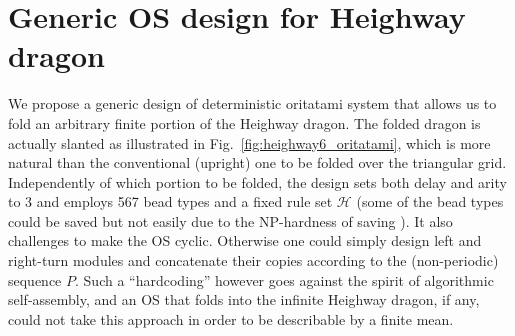 	\section{Generic OS design for Heighway dragon}



We propose a generic design of deterministic oritatami system that allows us to fold an arbitrary finite portion of the Heighway dragon. 
The folded dragon is actually slanted as illustrated in Fig.~\ref{fig:heighway6_oritatami}, which is more natural than the conventional (upright) one to be folded over the triangular grid. 
Independently of which portion to be folded, the design sets both delay and arity to 3 and employs 567 bead types and a fixed rule set $\mathcal{H}$ (some of the bead types could be saved but not easily due to the NP-hardness of saving \cite{HanKim2017}). 
It also challenges to make the OS cyclic. 
Otherwise one could simply design left and right-turn modules and concatenate their copies according to the (non-periodic) sequence $P$. 
Such a ``hardcoding'' however goes against the spirit of algorithmic self-assembly, and an OS that folds into the infinite Heighway dragon, if any, could not take this approach in order to be describable by a finite mean. 


